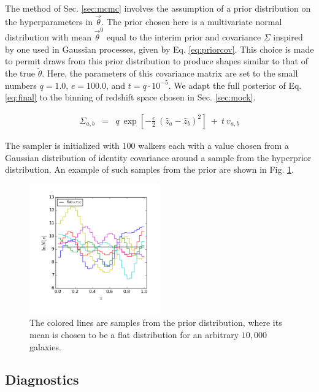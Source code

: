 \documentclass[preprint]{aastex}
\newcommand{\textul}{\underline}
\begin{document}
The method of Sec. \ref{sec:mcmc} involves the assumption of a prior 
distribution on the hyperparameters in $\vec{\theta}$.  The prior chosen here 
is a multivariate normal distribution with mean $\vec{\theta}^{0}$ equal to the 
interim prior and covariance $\textul{\Sigma}$ inspired by one used in Gaussian 
processes, given by Eq. \ref{eq:priorcov}.  This choice is made to permit draws 
from this prior distribution to produce shapes similar to that of the true 
$\tilde{\theta}$.  Here, the parameters of this covariance matrix are set to 
the small numbers $q=1.0$, $e=100.0$, and $t=q\cdot10^{-5}$.  We adapt the full 
posterior of Eq. \ref{eq:final} to the binning of redshift space chosen in Sec. 
\ref{sec:mock}.

\begin{eqnarray}
\label{eq:priorcov}
\Sigma_{a,b} &=& q\ \exp[-\frac{e}{2}\ (\bar{z}_{a}-\bar{z}_{b})^{2}]\ +\ t\ 
v_{a,b}
\end{eqnarray}

The sampler is initialized with $100$ walkers each with a value chosen from a 
Gaussian distribution of identity covariance around a sample from the 
hyperprior distribution.  An example of such samples from the prior are shown 
in Fig. \ref{fig:prior}.

\begin{figure}
\includegraphics[width=0.5\textwidth]{figs/priorsamps.png}
\caption{The colored lines are samples from the prior distribution, where its 
mean is chosen to be a flat distribution for an arbitrary $10,000$ galaxies.}
\label{fig:prior}
\end{figure}

\clearpage
\subsection{Diagnostics}
\label{sec:diag}
\end{document}
